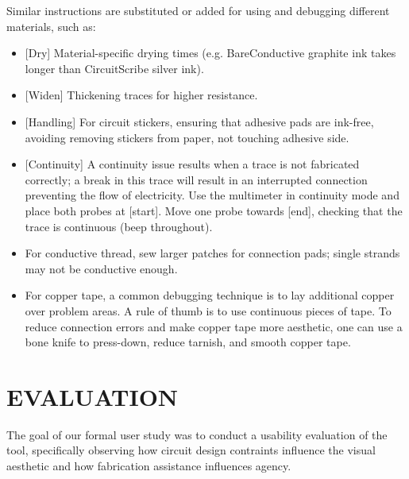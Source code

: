 \documentclass{sigchi}
\begin{document}
        Similar instructions are substituted or added for using and debugging different materials, such as:
        \begin{itemize}   
          \item {[}Dry{]} Material-specific drying times (e.g. BareConductive graphite ink takes longer than CircuitScribe silver ink). 
          \item {[}Widen{]} Thickening traces for higher resistance. 
          \item {[}Handling{]} For circuit stickers, ensuring that adhesive pads are ink-free, avoiding removing stickers from paper, not touching adhesive side. %
          \item {[}Continuity{]} A continuity issue results when a trace is not fabricated correctly; a break in this trace will result in an interrupted connection preventing the flow of electricity. Use the multimeter in continuity mode and place both probes at [start]. Move one probe towards [end], checking that the trace is continuous (beep throughout).  
          \item For conductive thread, sew larger patches for connection pads; single strands may not be conductive enough. 
          \item For copper tape, a common debugging technique is to lay additional copper over problem areas. A rule of thumb is to use continuous pieces of tape. To reduce connection errors and make copper tape more aesthetic, one can use a bone knife to press-down, reduce tarnish, and smooth copper tape. 
        \end{itemize}

\section{EVALUATION}
    The goal of our formal user study was to conduct a usability evaluation of the tool, specifically observing how circuit design contraints influence the visual aesthetic and how fabrication assistance influences agency. 
\end{document}
